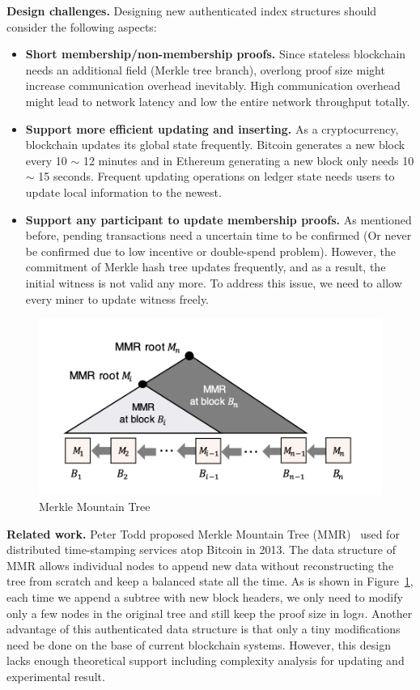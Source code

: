 \documentclass[conference]{IEEEtran}
\begin{document}
\textbf{Design challenges.} 
Designing new authenticated index structures should consider the following aspects:

\begin{itemize}
  \item \textbf{Short membership/non-membership proofs.} 
  Since stateless blockchain needs an additional field (Merkle tree branch), overlong proof size might increase communication overhead inevitably.
  High communication overhead might lead to network latency and low the entire network throughput totally.
  \item \textbf{Support more efficient updating and inserting.}
  As a cryptocurrency, blockchain updates its global state frequently. Bitcoin generates a new block every 10 $\sim$ 12 minutes and in Ethereum generating a new block only needs 10 $\sim$ 15 seconds.
  Frequent updating operations on ledger state needs users to update local information to the newest.
  \item \textbf{Support any participant to update membership proofs.}
  As mentioned before, pending transactions need a uncertain time to be confirmed (Or never be confirmed due to low incentive or double-spend problem).
  However, the commitment of Merkle hash tree updates frequently, and as a result, the initial witness is not valid any more.
  To address this issue, we need to allow every miner to update witness freely.
\end{itemize}

\begin{figure}[!t]
  \centering
  \includegraphics[width=\linewidth]{figs/MMR.png}
  \caption{Merkle Mountain Tree}
  \label{e-trie}
\end{figure}

\textbf{Related work.}
Peter Todd proposed Merkle Mountain Tree (MMR)~\cite{Tod} used for distributed time-stamping services atop Bitcoin in 2013. 
%
The data structure of MMR allows individual nodes to append new data without reconstructing the tree from scratch and keep a balanced state all the time.
%
As is shown in Figure~\ref{e-trie}, each time we append a subtree with new block headers, we only need to modify only a few nodes in the original tree and still keep the proof size in log\(n\).
%
Another advantage of this authenticated data structure is that only a tiny modifications need be done on the base of current blockchain systems.
%
However, this design lacks enough theoretical support including complexity analysis for updating and experimental result.
\end{document}
